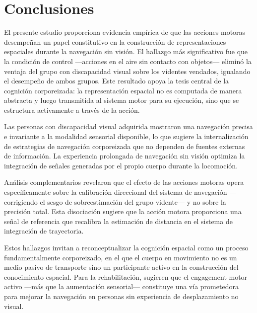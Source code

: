 \documentclass[12pt,letterpaper]{article}
\begin{document}
\section{Conclusiones}

El presente estudio proporciona evidencia empírica de que las acciones motoras desempeñan un papel constitutivo en la construcción de representaciones espaciales durante la navegación sin visión. El hallazgo más significativo fue que la condición de control ---acciones en el aire sin contacto con objetos--- eliminó la ventaja del grupo con discapacidad visual sobre los videntes vendados, igualando el desempeño de ambos grupos. Este resultado apoya la tesis central de la cognición corporeizada: la representación espacial no es computada de manera abstracta y luego transmitida al sistema motor para su ejecución, sino que se estructura activamente a través de la acción.

Las personas con discapacidad visual adquirida mostraron una navegación precisa e invariante a la modalidad sensorial disponible, lo que sugiere la internalización de estrategias de navegación corporeizada que no dependen de fuentes externas de información. La experiencia prolongada de navegación sin visión optimiza la integración de señales generadas por el propio cuerpo durante la locomoción.

Análisis complementarios revelaron que el efecto de las acciones motoras opera específicamente sobre la calibración direccional del sistema de navegación ---corrigiendo el sesgo de sobreestimación del grupo vidente--- y no sobre la precisión total. Esta disociación sugiere que la acción motora proporciona una señal de referencia que recalibra la estimación de distancia en el sistema de integración de trayectoria.

Estos hallazgos invitan a reconceptualizar la cognición espacial como un proceso fundamentalmente corporeizado, en el que el cuerpo en movimiento no es un medio pasivo de transporte sino un participante activo en la construcción del conocimiento espacial. Para la rehabilitación, sugieren que el engagement motor activo ---más que la aumentación sensorial--- constituye una vía prometedora para mejorar la navegación en personas sin experiencia de desplazamiento no visual.

\newpage
\printbibliography[title=Referencias]
\end{document}
